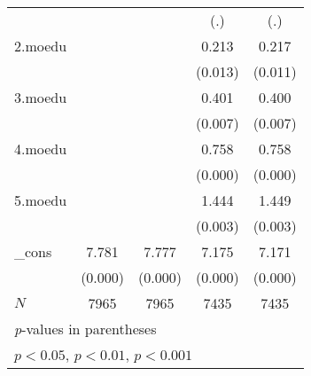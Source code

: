 {\begin{tabular}{l*{4}{c}}
            &                     &                     &         (.)         &         (.)         \\
[1em]
2.moedu     &                     &                     &       0.213\sym{*}  &       0.217\sym{*}  \\
            &                     &                     &     (0.013)         &     (0.011)         \\
[1em]
3.moedu     &                     &                     &       0.401\sym{**} &       0.400\sym{**} \\
            &                     &                     &     (0.007)         &     (0.007)         \\
[1em]
4.moedu     &                     &                     &       0.758\sym{***}&       0.758\sym{***}\\
            &                     &                     &     (0.000)         &     (0.000)         \\
[1em]
5.moedu     &                     &                     &       1.444\sym{**} &       1.449\sym{**} \\
            &                     &                     &     (0.003)         &     (0.003)         \\
[1em]
\_cons      &       7.781\sym{***}&       7.777\sym{***}&       7.175\sym{***}&       7.171\sym{***}\\
            &     (0.000)         &     (0.000)         &     (0.000)         &     (0.000)         \\
\hline
\(N\)       &        7965         &        7965         &        7435         &        7435         \\
\hline\hline
\multicolumn{5}{l}{\footnotesize \textit{p}-values in parentheses}\\
\multicolumn{5}{l}{\footnotesize \sym{*} \(p<0.05\), \sym{**} \(p<0.01\), \sym{***} \(p<0.001\)}\\
\end{tabular}
}
